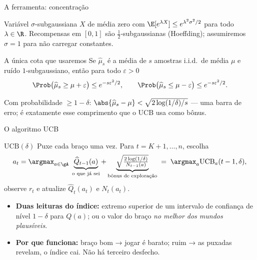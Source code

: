\documentclass[aspectratio=169, 11pt]{beamer}
\newcommand{\Qh}{\widehat{Q}}
\newcommand{\muh}{\widehat{\mu}}
\newcommand{\ucb}{\mathrm{UCB}}
\begin{document}
\begin{frame}{A ferramenta: concentração}
  \begin{defbox}{Variável $\sigma$-subgaussiana}
    $X$ de média zero com
    $\E[e^{\lambda X}] \le e^{\lambda^{2}\sigma^{2}/2}$ para todo
    $\lambda\in\R$. Recompensas em $[0,1]$ são $\tfrac12$-subgaussianas
    (Hoeffding); assumiremos $\sigma=1$ para não carregar constantes.
  \end{defbox}

  \begin{teobox}{A única cota que usaremos}
    Se $\muh_s$ é a média de $s$ amostras i.i.d.\ de média $\mu$ e ruído
    $1$-subgaussiano, então para todo $\varepsilon>0$
    \[
      \Prob\bigl(\muh_s \ge \mu+\varepsilon\bigr) \le e^{-s\varepsilon^{2}/2},
      \qquad
      \Prob\bigl(\muh_s \le \mu-\varepsilon\bigr) \le e^{-s\varepsilon^{2}/2}.
    \]
  \end{teobox}

  \begin{ideiabox}
    Com probabilidade $\ge 1-\delta$: $\abs{\muh_s-\mu} <
    \sqrt{2\log(1/\delta)/s}$ --- uma \alert{barra de erro}; é exatamente
    esse comprimento que o UCB usa como bônus.
  \end{ideiabox}
\end{frame}

\begin{frame}{O algoritmo UCB}
  \begin{algbox}{$\ucb(\delta)$}
    {\small Puxe cada braço uma vez. Para $t=K+1,\dots,n$, escolha
    \[
      a_t = \argmax_{a\in\gA}\;
        \underbrace{\Qh_{t-1}(a)}_{\text{o que já sei}}
        + \underbrace{\sqrt{\tfrac{2\log(1/\delta)}{N_{t-1}(a)}}}_{\text{bônus de exploração}}
      \;=\; \argmax_a \ucb_a(t-1,\delta),
    \]
    observe $r_t$ e atualize $\Qh_t(a_t)$ e $N_t(a_t)$.}
  \end{algbox}

  \begin{itemize}\small
    \item \textbf{Duas leituras do índice:} extremo superior de um intervalo
          de confiança de nível $1-\delta$ para $Q(a)$; ou o valor do braço
          \emph{no melhor dos mundos plausíveis}.
    \item \textbf{Por que funciona:} braço bom → jogar é barato; ruim → as
          puxadas revelam, o índice cai. Não há terceiro desfecho.
  \end{itemize}
\end{frame}
\end{document}
